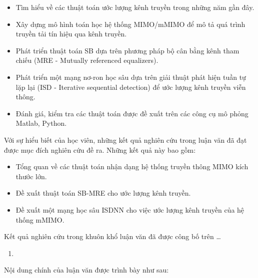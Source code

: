 \renewcommand{\labelitemi}{$-$}
\begin{itemize}
	\item Tìm hiểu về các thuật toán ước lượng kênh truyền trong những năm gần đây.
	\item Xây dựng mô hình toán học hệ thống MIMO/mMIMO để mô tả quá trình truyền tải tín hiệu qua kênh truyền.
	\item Phát triển thuật toán SB dựa trên phương pháp bộ cân bằng kênh tham chiếu (MRE - Mutually referenced equalizers).
	\item Phát triển một mạng nơ-ron học sâu dựa trên giải thuật phát hiện tuần tự lặp lại (ISD - Iterative sequential detection) để ước lượng kênh truyền viễn thông.
	\item Đánh giá, kiểm tra các thuật toán được đề xuất trên các công cụ mô phỏng Matlab, Python.
\end{itemize} 
\vspace{0.3cm}


Với sự hiểu biết của học viên, những kết quả nghiên cứu trong luận văn đã đạt được mục đích nghiên cứu đề ra. Những kết quả này bao gồm:

\renewcommand{\labelitemi}{$-$}
\begin{itemize}
	\item Tổng quan về các thuật toán nhận dạng hệ thống truyền thông MIMO kích thước lớn.
	\item Đề xuất thuật toán SB-MRE cho ước lượng kênh truyền.
	\item Đề xuất một mạng học sâu ISDNN cho việc ước lượng kênh truyền của hệ thống mMIMO.
\end{itemize} 

Kết quả nghiên cứu trong khuôn khổ luận văn đã được công bố trên \ldots
\begin{enumerate}
    \item 
\end{enumerate}

\vspace{0.5cm}

Nội dung chính của luận văn được trình bày như sau:

